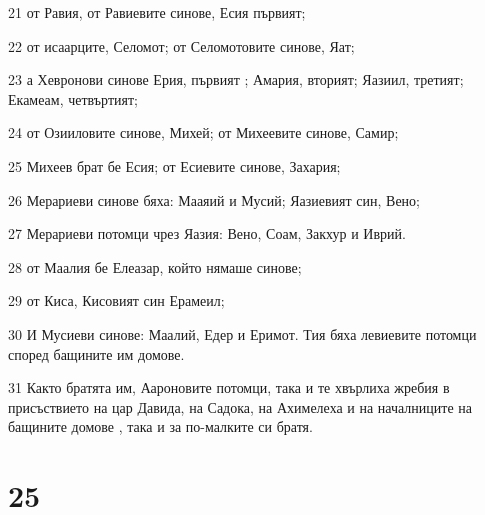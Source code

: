 \par 21 от Равия, от Равиевите синове, Есия първият;
\par 22 от исаарците, Селомот; от Селомотовите синове, Яат;
\par 23 а Хевронови синове Ерия, първият ; Амария, вторият; Яазиил, третият; Екамеам, четвъртият;
\par 24 от Озииловите синове, Михей; от Михеевите синове, Самир;
\par 25 Михеев брат бе Есия; от Есиевите синове, Захария;
\par 26 Мерариеви синове бяха: Мааяий и Мусий; Яазиевият син, Вено;
\par 27 Мерариеви потомци чрез Яазия: Вено, Соам, Закхур и Иврий.
\par 28 от Маалия бе Елеазар, който нямаше синове;
\par 29 от Киса, Кисовият син Ерамеил;
\par 30 И Мусиеви синове: Маалий, Едер и Еримот. Тия бяха левиевите потомци според бащините им домове.
\par 31 Както братята им, Аароновите потомци, така и те хвърлиха жребия в присъствието на цар Давида, на Садока, на Ахимелеха и на началниците на бащините домове , така и за по-малките си братя.

\chapter{25}

